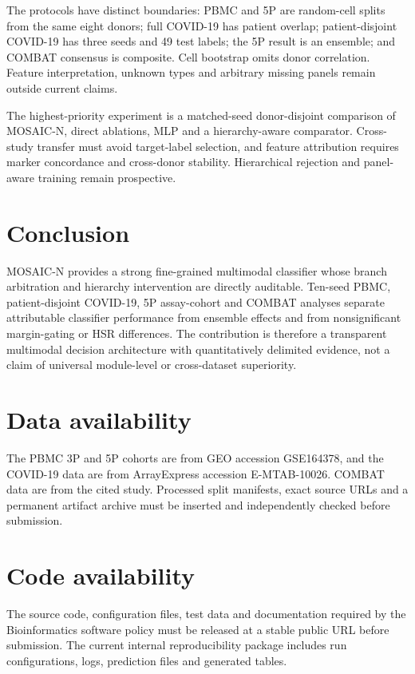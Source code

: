 \documentclass[unnumsec,webpdf,contemporary,large,numbered]{oup-authoring-template}
\begin{document}
The protocols have distinct boundaries: PBMC and 5P are random-cell splits from the same eight donors; full COVID-19 has patient overlap; patient-disjoint COVID-19 has three seeds and 49 test labels; the 5P result is an ensemble; and COMBAT consensus is composite. Cell bootstrap omits donor correlation. Feature interpretation, unknown types and arbitrary missing panels remain outside current claims.

The highest-priority experiment is a matched-seed donor-disjoint comparison of MOSAIC-N, direct ablations, MLP and a hierarchy-aware comparator. Cross-study transfer must avoid target-label selection, and feature attribution requires marker concordance and cross-donor stability. Hierarchical rejection and panel-aware training remain prospective.

\section{Conclusion}

MOSAIC-N provides a strong fine-grained multimodal classifier whose branch arbitration and hierarchy intervention are directly auditable. Ten-seed PBMC, patient-disjoint COVID-19, 5P assay-cohort and COMBAT analyses separate attributable classifier performance from ensemble effects and from nonsignificant margin-gating or HSR differences. The contribution is therefore a transparent multimodal decision architecture with quantitatively delimited evidence, not a claim of universal module-level or cross-dataset superiority.

\section{Data availability}

The PBMC 3P and 5P cohorts are from GEO accession GSE164378, and the COVID-19 data are from ArrayExpress accession E-MTAB-10026. COMBAT data are from the cited study. Processed split manifests, exact source URLs and a permanent artifact archive must be inserted and independently checked before submission.

\section{Code availability}

The source code, configuration files, test data and documentation required by the Bioinformatics software policy must be released at a stable public URL before submission. The current internal reproducibility package includes run configurations, logs, prediction files and generated tables.
\end{document}

